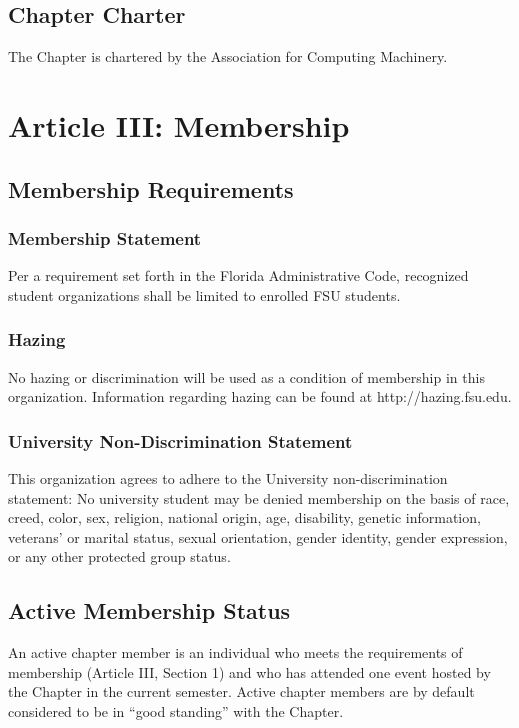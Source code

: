\documentclass{article}
\begin{document}
\subsection{Chapter Charter}

The Chapter is chartered by the Association for Computing Machinery.

\section{Article III: Membership}

\subsection{Membership Requirements}

\subsubsection{Membership Statement}

Per a requirement set forth in the Florida Administrative Code,
recognized student organizations shall be limited to enrolled FSU
students.


\subsubsection{Hazing}

No hazing or discrimination will be used as a condition of membership in
this organization. Information regarding hazing can be found at
http://hazing.fsu.edu.

\subsubsection{University Non-Discrimination Statement}

This organization agrees to adhere to the University non-discrimination
statement: No university student may be denied membership on the basis
of race, creed, color, sex, religion, national origin, age, disability,
genetic information, veterans' or marital status, sexual orientation,
gender identity, gender expression, or any other protected group status.

\subsection{Active Membership Status}

An active chapter member is an individual who meets the requirements of
membership (Article III, Section 1) and who has attended one event
hosted by the Chapter in the current semester. Active chapter members
are by default considered to be in ``good standing'' with the Chapter.
\end{document}
